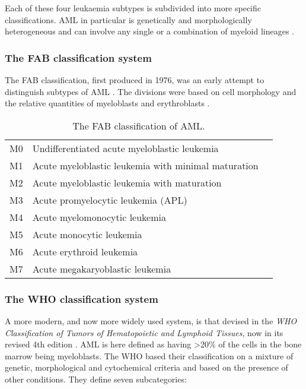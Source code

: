Each of these four leukaemia subtypes is subdivided into more specific classifications. \ac{AML} in particular is genetically and morphologically heterogeneous and can involve any single or a combination of myeloid lineages \citep{whoclassification, Kouchkovsky2016}. 

\subsubsection{The FAB classification system}
The \ac{FAB} classification, first produced in 1976, was an early attempt to distinguish subtypes of \ac{AML} \citep{bennett1976proposals}. The divisions were based on cell morphology and the relative quantities of myeloblasts and erythroblasts \citep{acsamlsubtypes}.

\begin{table}[h]
\centering
\caption{The FAB classification of AML.}
\label{tab:FABclassification}
\begin{tabular}{lll}
\hline
M0 & Undifferentiated acute myeloblastic leukemia        &  \\ 
M1 & Acute myeloblastic leukemia with minimal maturation &  \\
M2 & Acute myeloblastic leukemia with maturation         &  \\
M3 & Acute promyelocytic leukemia (APL)                  &  \\
M4 & Acute myelomonocytic leukemia                       &  \\
M5 & Acute monocytic leukemia                            &  \\
M6 & Acute erythroid leukemia                            &  \\
M7 & Acute megakaryoblastic leukemia                     &  \\ \hline
\end{tabular}
\end{table}


\subsubsection{The WHO classification system}

A more modern, and now more widely used system, is that devised in the \textit{\ac{WHO} Classification of Tumors of Hematopoietic and Lymphoid Tissues}, now in its revised 4th edition \citep{whoclassification}. \ac{AML} is here defined as having >20\% of the cells in the bone marrow being myeloblasts. The \ac{WHO} based their classification on a mixture of genetic, morphological and cytochemical criteria and based on the presence of other conditions. They define seven subcategories:

